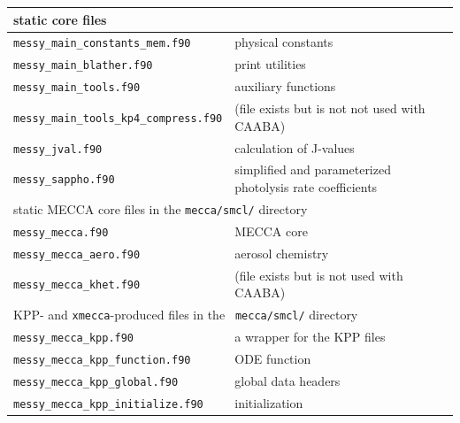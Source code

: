 \documentclass[twoside]{article}
\begin{document}
\begin{table}[htb]
\begin{center}
\begin{tabular}{lp{}}
      \hline
      \multicolumn{2}{l}{static core files}\\
      \hline
      \verb|messy_main_constants_mem.f90|      & physical constants\\
      \verb|messy_main_blather.f90|            & print utilities\\
      \verb|messy_main_tools.f90|              & auxiliary functions\\
      \verb|messy_main_tools_kp4_compress.f90| & (file exists but is not
                                                 not used with CAABA)\\
      \verb|messy_jval.f90|                    & calculation of J-values\\
      \verb|messy_sappho.f90|                  & simplified and parameterized 
                                                 photolysis rate coefficients\\
      \hline
      \multicolumn{2}{l}{static MECCA core files in the {\tt mecca/smcl/}
        directory}\\
      \hline
      \verb|messy_mecca.f90|                   & MECCA core\\
      \verb|messy_mecca_aero.f90|              & aerosol chemistry\\
      \verb|messy_mecca_khet.f90|              & (file exists but is not
                                                 used with CAABA)\\
      \hline
      \multicolumn{2}{l}{KPP- and {\tt xmecca}-produced files in the {\tt
          mecca/smcl/} directory}\\
      \hline
      \verb|messy_mecca_kpp.f90|               & a wrapper for the KPP files\\
      \verb|messy_mecca_kpp_function.f90|      & ODE function\\
      \verb|messy_mecca_kpp_global.f90|        & global data headers\\
      \verb|messy_mecca_kpp_initialize.f90|    & initialization\\

\end{tabular}
\end{center}
\end{table}
\end{document}
